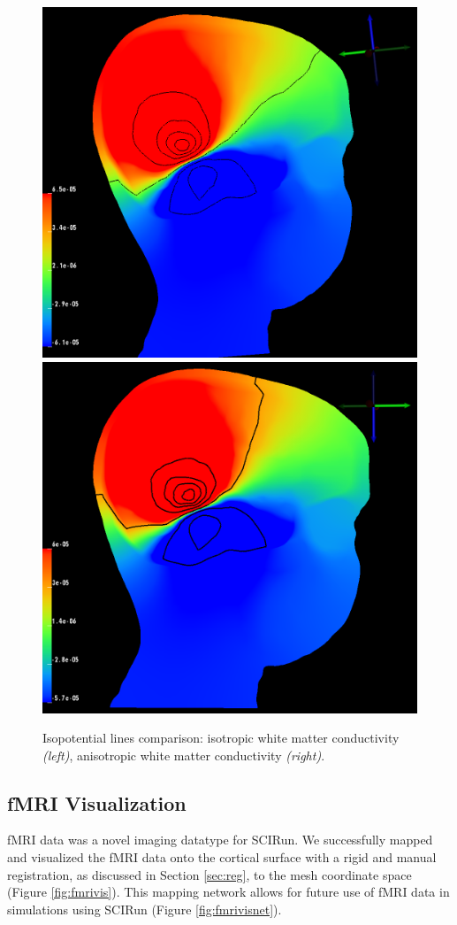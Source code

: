 \begin{figure}[H]
\begin{center}
\includegraphics[width=.49\textwidth]{Figures/iso_isolines}
\includegraphics[width = .49\textwidth]{Figures/aniso_isolines}
\caption{Isopotential lines comparison: isotropic white matter conductivity \textit{(left)}, anisotropic white matter conductivity \textit{(right)}.}
\label{fig:isolines}
\end{center}
\end{figure}

\subsection{fMRI Visualization}

fMRI data was a novel imaging datatype for SCIRun. We successfully mapped and visualized the fMRI data onto the cortical surface with a rigid and manual registration, as discussed in Section \ref{sec:reg}, to the mesh coordinate space (Figure \ref{fig:fmrivis}). This mapping network allows for future use of fMRI data in simulations using SCIRun (Figure \ref{fig:fmrivisnet}).

